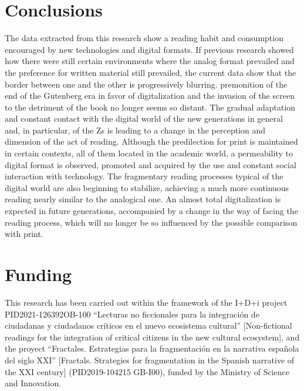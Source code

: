 \documentclass[english]{textolivre}
\begin{document}
\section{Conclusions}
The data extracted from this research show a reading habit and consumption encouraged by new technologies and digital formats. If previous research \cite{alvarez2019generacion, tabernero_sala_habitos_2020} showed how there were still certain environments where the analog format prevailed and the preference for written material still prevailed, the current data show that the border between one and the other is progressively blurring.  premonition of the end of the Gutenberg era in favor of digitalization and the invasion of the screen to the detriment of the book no longer seems so distant. The gradual adaptation and constant contact with the digital world of the new generations in general and, in particular, of the Zs is leading to a change in the perception and dimension of the act of reading. Although the predilection for print is maintained in certain contexts, all of them located in the academic world, a permeability to digital format is observed, promoted and acquired by the use and constant social interaction with technology. The fragmentary reading processes typical of the digital world are also beginning to stabilize, achieving a much more continuous reading nearly similar to the analogical one. An almost total digitalization is expected in future generations, accompanied by a change in the way of facing the reading process, which will no longer be so influenced by the possible comparison with print. 

\section{Funding}
This research has been carried out within the framework of the I+D+i project PID2021-126392OB-100 “Lecturas no ficcionales para la integración de ciudadanas y ciudadanos críticos en el nuevo ecosistema cultural” [Non-fictional readings for the integration of critical citizens in the new cultural ecosystem], and the proyect “Fractales. Estrategias para la fragmentación en la narrativa española del siglo XXI” [Fractals. Strategies for fragmentation in the Spanish narrative of the XXI century] (PID2019-104215 GB-I00), funded by the Ministry of Science and Innovation. 



\printbibliography\label{sec-bib}
\end{document}
